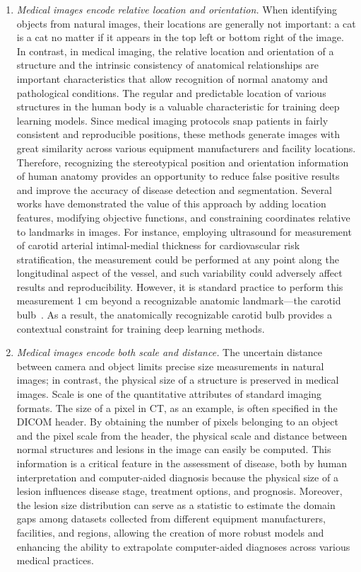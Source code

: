 \begin{enumerate}
    \item \textit{Medical images encode relative location and orientation.} When identifying objects from natural images, their locations are generally not important: a cat is a cat no matter if it appears in the top left or bottom right of the image. In contrast, in medical imaging, the relative location and orientation of a structure and the intrinsic consistency of anatomical relationships are important characteristics that allow recognition of normal anatomy and pathological conditions. The regular and predictable location of various structures in the human body is a valuable characteristic for training deep learning models. Since medical imaging protocols snap patients in fairly consistent and reproducible positions, these methods generate images with great similarity across various equipment manufacturers and facility locations. Therefore, recognizing the stereotypical position and orientation information of human anatomy provides an opportunity to reduce false positive results and improve the accuracy of disease detection and segmentation. Several works have demonstrated the value of this approach by adding location features, modifying objective functions, and constraining coordinates relative to landmarks in images. For instance, employing ultrasound for measurement of carotid arterial intimal-medial thickness for cardiovascular risk stratification, the measurement could be performed at any point along the longitudinal aspect of the vessel, and such variability could adversely affect results and reproducibility. However, it is standard practice to perform this measurement  1 cm beyond a recognizable anatomic landmark---the carotid bulb~\citep{stein2008use}. As a result, the anatomically recognizable carotid bulb provides a contextual constraint for training deep learning methods. 
    
    \item \textit{Medical images encode both scale and distance.} The uncertain distance between camera and object limits precise size measurements in natural images; in contrast, the physical size of a structure is preserved in medical images. Scale is one of the quantitative attributes of standard imaging formats. The size of a pixel in CT, as an example, is often specified in the DICOM header. By obtaining the number of pixels belonging to an object and the pixel scale from the header, the physical scale and distance between normal structures and lesions in the image can easily be computed. This information is a critical feature in the assessment of disease, both by human interpretation and computer-aided diagnosis because the physical size of a lesion influences disease stage, treatment options, and prognosis. Moreover, the lesion size distribution can serve as a statistic to estimate the domain gaps among datasets collected from different equipment manufacturers, facilities, and regions, allowing the creation of more robust models and enhancing the ability to extrapolate computer-aided diagnoses across various medical practices.
    

\end{enumerate}
